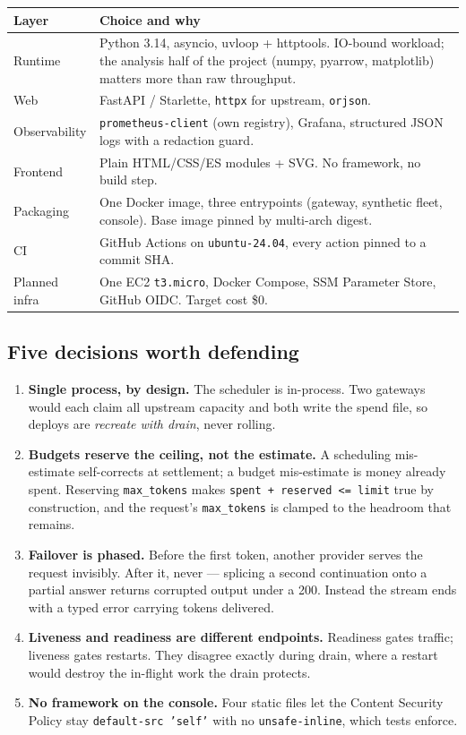\documentclass[10pt,a4paper]{article}
\begin{document}
\begin{tabularx}{\textwidth}{@{}lX@{}}
\toprule
\textbf{Layer} & \textbf{Choice and why} \\
\midrule
Runtime & Python 3.14, asyncio, uvloop + httptools. IO-bound workload; the
  analysis half of the project (numpy, pyarrow, matplotlib) matters more than
  raw throughput. \\
Web & FastAPI / Starlette, \texttt{httpx} for upstream, \texttt{orjson}. \\
Observability & \texttt{prometheus-client} (own registry), Grafana, structured
  JSON logs with a redaction guard. \\
Frontend & Plain HTML/CSS/ES modules + SVG. No framework, no build step. \\
Packaging & One Docker image, three entrypoints (gateway, synthetic fleet,
  console). Base image pinned by multi-arch digest. \\
CI & GitHub Actions on \texttt{ubuntu-24.04}, every action pinned to a commit
  SHA. \\
Planned infra & One EC2 \texttt{t3.micro}, Docker Compose, SSM Parameter Store,
  GitHub OIDC. Target cost \$0. \\
\bottomrule
\end{tabularx}

\subsection{Five decisions worth defending}

\begin{enumerate}
\item \textbf{Single process, by design.} The scheduler is in-process. Two
  gateways would each claim all upstream capacity and both write the spend
  file, so deploys are \emph{recreate with drain}, never rolling.
\item \textbf{Budgets reserve the ceiling, not the estimate.} A scheduling
  mis-estimate self-corrects at settlement; a budget mis-estimate is money
  already spent. Reserving \texttt{max\_tokens} makes
  \texttt{spent + reserved <= limit} true by construction, and the request's
  \texttt{max\_tokens} is clamped to the headroom that remains.
\item \textbf{Failover is phased.} Before the first token, another provider
  serves the request invisibly. After it, never — splicing a second
  continuation onto a partial answer returns corrupted output under a 200.
  Instead the stream ends with a typed error carrying tokens delivered.
\item \textbf{Liveness and readiness are different endpoints.} Readiness gates
  traffic; liveness gates restarts. They disagree exactly during drain, where
  a restart would destroy the in-flight work the drain protects.
\item \textbf{No framework on the console.} Four static files let the Content
  Security Policy stay \texttt{default-src 'self'} with no
  \texttt{unsafe-inline}, which tests enforce.
\end{enumerate}
\end{document}
